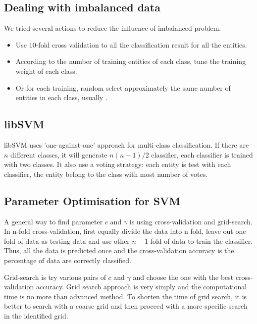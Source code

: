 \subsection{Dealing with imbalanced data}
We tried several actions to reduce the influence of imbalanced problem.
\begin{itemize}
\item Use 10-fold cross validation to all the classification result for all the entities. 
\item According to the number of training entities of each class, tune the training weight of each class.
\item Or for each training, random select approximately the same number of entities in each class, usually .
\end{itemize}
\subsection{libSVM}
libSVM uses 'one-against-one' approach for multi-class classification\cite{CC01a}. If there are $n$ different classes, it will generate $n(n-1)/2$ classifier, each classifier is trained with two classes. It also use a voting strategy: each entity is test with each classifier, the entity belong to the class with most number of votes.
\subsection{Parameter Optimisation for SVM}
A general way to find parameter $c$ and $\gamma$ is using cross-validation and grid-search. In n-fold cross-validation, first equally divide the data into n fold, leave out one fold of data as testing data and use other $n-1$ fold of data to train the classifier. Thus, all the data is predicted once and the cross-validation accuracy is the percentage of data are correctly classified.
 
Grid-search is try various pairs of $c$ and $\gamma$ and choose the one with the best cross-validation accuracy. Grid search approach is very simply and the computational time is no more than advanced method. To shorten the time of grid search, it is better to search with a coarse grid and then proceed with a more specific search in the identified grid.
